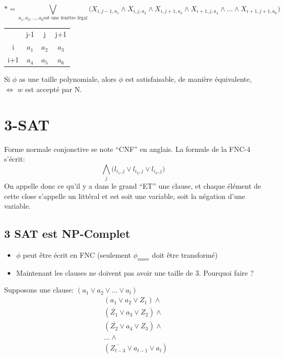 \documentclass[a4paper,12pt]{article}
\begin{document}
    $$* = \bigvee\limits_{a_1, a_2, ..., a_6\text{est une fenêtre légal}} \big(X_{i, j-1, a_1} \wedge X_{i, j, a_2} \wedge X_{i, j+1, a_3} \wedge X_{i+1, j, a_4} \wedge ... \wedge X_{i+1, j+1, a_6}\big)$$

    \begin{table}[h]
      \centering
      \begin{tabular}{cccc}
			      & j-1                         & j                          & j+1                        \\ \cline{2-4}
      \multicolumn{1}{c|}{i}   & \multicolumn{1}{c|}{$a_1$} & \multicolumn{1}{c|}{$a_2$} & \multicolumn{1}{c|}{$a_3$} \\ \cline{2-4}
      \multicolumn{1}{c|}{i+1} & \multicolumn{1}{c|}{$a_4$} & \multicolumn{1}{c|}{$a_5$} & \multicolumn{1}{c|}{$a_6$} \\ \cline{2-4}
      \end{tabular}
    \end{table}

    Si $\phi$ as une taille polynomiale, alors $\phi$ est satisfaisable, de manière équivalente, $\Leftrightarrow$ $w$ est accepté par N.


\section{3-SAT}
  Forme normale conjonctive se note ``CNF'' en anglais.  La formule de la FNC-4 s'écrit:
  $$\bigwedge\limits_{j} \big(l_{i_1, j} \vee l_{i_2, j} \vee l_{i_3, j} \big)$$
  On appelle donc ce qu'il y a dans le grand ``ET'' une clause, et chaque élément de cette close s'appelle un littéral et est soit une variable, soit la négation d'une variable.

  \subsection{3 SAT est NP-Complet}
    \begin{itemize}
      \item $\phi$ peut être écrit en FNC (seulement $\phi_{move}$ doit être transformé)
      \item Maintenant les clauses ne doivent pas avoir une taille de 3. Pourquoi faire ?
    \end{itemize}

    Supposons une clause: $(a_1 \vee a_2 \vee ... \vee a_l)$
    \begin{align*}
      &(a_1 \vee a_2 \vee Z_1) \wedge \\
      &(\overline{Z_1} \vee a_3 \vee Z_2) \wedge \\
      &(\overline{Z_2} \vee a_4 \vee Z_3) \wedge \\
      &... \wedge\\
      &(\overline{Z_{l-3}} \vee a_{l-1} \vee a_l)
    \end{align*}
\end{document}
